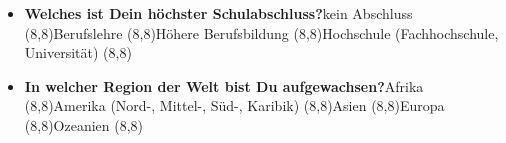 \documentclass[../../main.tex]{subfiles}
\begin{document}
\begin{itemize}
  \item \textbf{Welches ist Dein höchster Schulabschluss?}\newline \footnotesize{kein Abschluss \framebox(8,8){}\hspace{1cm}Berufslehre \framebox(8,8){}\hspace{1cm}Höhere Berufsbildung \framebox(8,8){}\hspace{1cm}Hochschule (Fachhochschule, Universität) \framebox(8,8){} }\normalsize
  
  \item \textbf{In welcher Region der Welt bist Du aufgewachsen?}\newline \footnotesize{Afrika \framebox(8,8){}\hspace{1cm}Amerika (Nord-, Mittel-, Süd-, Karibik) \framebox(8,8){}\hspace{1cm}Asien \framebox(8,8){}\hspace{1cm}Europa \framebox(8,8){}\hspace{1cm}Ozeanien \framebox(8,8){} }\normalsize
\end{itemize}
\end{document}
